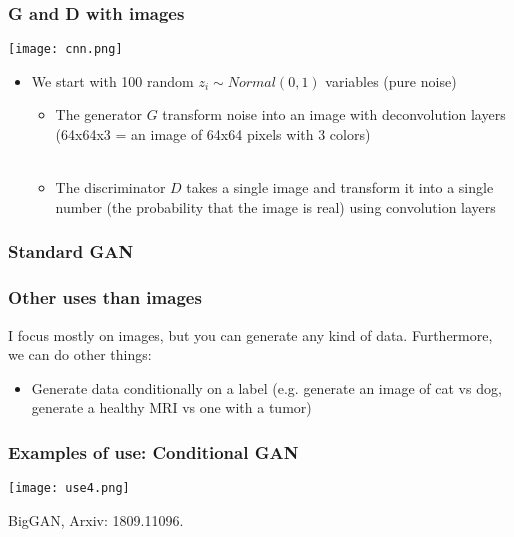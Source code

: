 \documentclass[t]{beamer}
\begin{document}
\begin{frame}
\frametitle{G and D with images}
\texttt{[image: cnn.png]}

\begin{itemize}
\item We start with 100 random $z_i \sim Normal(0,1)$ variables (pure noise)
\begin{itemize}
	\item The generator $G$ transform noise into an image with deconvolution layers
	(64x64x3 = an image of 64x64 pixels with 3 colors) \\~\\
	
	\item The discriminator $D$ takes a single image and transform it into a single number (the probability that the image is real) using convolution layers
\end{itemize}
\end{itemize}
\end{frame}


\begin{frame}
\frametitle{Standard GAN}
\centering
{}
\end{frame}


\begin{frame}
\frametitle{Other uses than images}

I focus mostly on images, but you can generate any kind of data.
Furthermore, we can do other things:

\begin{itemize}
	\item Generate data conditionally on a label (e.g. generate an image of cat vs dog, generate a healthy MRI vs one with a tumor)
	
	
	
	
	
\end{itemize}
\end{frame}


\begin{frame}
\frametitle{Examples of use: Conditional GAN}

\texttt{[image: use4.png]}

BigGAN, Arxiv: 1809.11096.

\end{frame}
\end{document}
